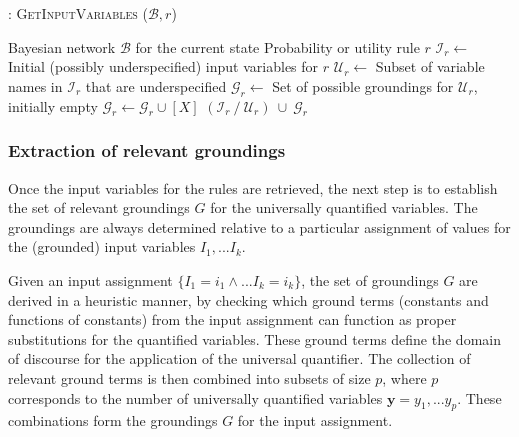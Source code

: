 \begin{algorithm}[h!]
\caption{: \textsc{GetInputVariables} ($\mathcal{B}, \mathit{r}$)}
\begin{algorithmic}[1] \vspace{1mm}
\REQUIRE Bayesian network $\mathcal{B}$ for the current state
\REQUIRE Probability or utility rule $\mathit{r}$ \vspace{1mm}
\STATE $\mathcal{I}_{r} \leftarrow $ Initial (possibly underspecified) input variables for $\mathit{r}$
\STATE $\mathcal{U}_{r} \leftarrow $ Subset of variable names in $\mathcal{I}_{r}$ that are underspecified
\STATE $\mathcal{G}_{r} \leftarrow$ Set of possible groundings for $\mathcal{U}_{r}$, initially empty
\STATE $\mathcal{G}_{r} \leftarrow \mathcal{G}_{r} \cup [X]$
\ENDIF
\ENDFOR
\ENDFOR
\RETURN $(\mathcal{I}_{r} \ / \ \mathcal{U}_{r}) \ \cup \  \mathcal{G}_{r}$
\end{algorithmic}
\label{algo:getinputvariables}
\end{algorithm}



\subsubsection*{Extraction of relevant groundings}

Once the input variables for the rules are retrieved, the next step is to establish the set of relevant groundings $G$ for the universally quantified variables.  The groundings are always determined relative to a particular assignment of values for the (grounded) input variables $I_1,...I_k$.

Given an input assignment $\{I_1\!=\!i_1 \land ... I_k\!=\!i_k\}$, the set of groundings $G$ are derived in a heuristic manner, by checking which ground terms (constants and functions of constants) from the input assignment can function as proper substitutions for the quantified variables.  These ground terms define the domain of discourse for the application of the universal quantifier. The collection of relevant ground terms is then combined into subsets of size $p$, where $p$ corresponds to the number of universally quantified variables $\mathbf{y} = y_1, ... y_p$. These combinations form the groundings $G$ for the input assignment. 


